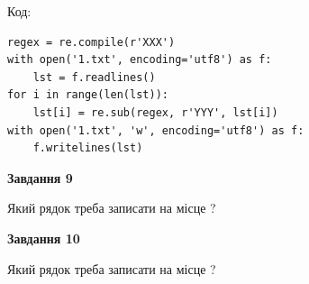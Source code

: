 \documentclass[12pt, ukrainian]{article}
\begin{document}
{\begin {large}
Код:



\begin{verbatim}
regex = re.compile(r'XXX')
with open('1.txt', encoding='utf8') as f:
    lst = f.readlines()
for i in range(len(lst)):
    lst[i] = re.sub(regex, r'YYY', lst[i])
with open('1.txt', 'w', encoding='utf8') as f:
    f.writelines(lst)
\end{verbatim}




{\begin {center}\textbf{Завдання 9}\end {center}}\par
Який рядок треба записати на місце  ?\par
\vspace{5mm}


{\begin {center}\textbf{Завдання 10}\end {center}}\par
Який рядок треба записати на місце  ?\par


\newpage


\end {large}}
\end{document}
